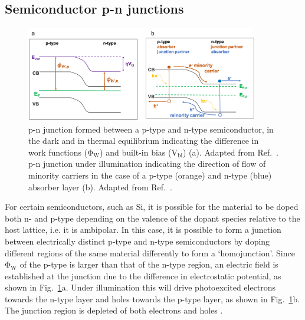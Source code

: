 \documentclass[11pt, twoside]{report}
\begin{document}
\subsection{Semiconductor p-n junctions}
\begin{figure}[h!]
  \centering
    \includegraphics[width=0.9\textwidth]{figures/new_p-n_schematic.png}
    \caption[p-n junction formed between a p-type and n-type semiconductor, in the dark and in thermal equilibrium indicating the difference in work functions ($\mathrm{\Phi_W}$) and built-in bias ($\mathrm{V_{bi}}$) (a). p-n junction under illumination indicating the direction of flow of minority carriers in the case of a p-type (orange) and n-type (blue) absorber layer (b).]{p-n junction formed between a p-type and n-type semiconductor, in the dark and in thermal equilibrium indicating the difference in work functions ($\mathrm{\Phi_W}$) and built-in bias ($\mathrm{V_{bi}}$) (a). Adapted from Ref.~. p-n junction under illumination indicating the direction of flow of minority carriers in the case of a p-type (orange) and n-type (blue) absorber layer (b). Adapted from Ref.~.}
  \label{p-n_schematic}
\end{figure}

For certain semiconductors, such as Si, it is possible for the material to be doped both n- and p-type depending on the valence of the dopant species relative to the host lattice, i.e. it is ambipolar. In this case, it is possible to form a junction between electrically distinct p-type and n-type semiconductors by doping different regions of the same material differently to form a `homojunction'. Since $\mathrm{\Phi_W}$ of the p-type is larger than that of the n-type region, an electric field is established at the junction due to the difference in electrostatic potential, as shown in Fig.~\ref{p-n_schematic}a. Under illumination this will drive photoexcited electrons towards the n-type layer and holes towards the p-type layer, as shown in Fig.~\ref{p-n_schematic}b. The junction region is depleted of both electrons and holes \cite{Nelson5}.
\end{document}
